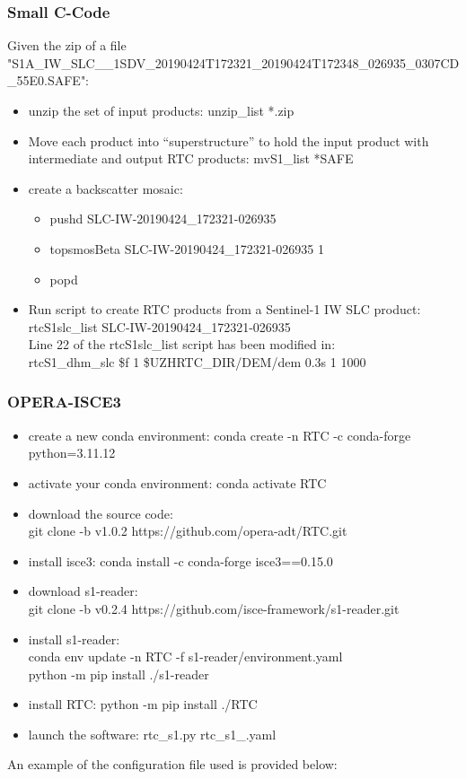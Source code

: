 \subsubsection{Small C-Code}
Given the zip of a file\\"S1A\_IW\_SLC\_\_1SDV\_20190424T172321\_20190424T172348\_026935\_0307CD\_55E0.SAFE":
\begin{itemize}
    \item unzip the set of input products:  unzip\_list *.zip 
    \item Move each product into “superstructure” to hold the input product with intermediate and output RTC products: mvS1\_list *SAFE
    \item create a backscatter mosaic:
    \begin{itemize}
        \item pushd SLC-IW-20190424\_172321-026935
        \item topsmosBeta SLC-IW-20190424\_172321-026935 1
        \item popd
    \end{itemize}
    \item Run script to create RTC products from a Sentinel-1 IW SLC product:\\ rtcS1slc\_list SLC-IW-20190424\_172321-026935\\
    Line 22 of the rtcS1slc\_list script has been modified in:\\ rtcS1\_dhm\_slc \$f 1 \$UZHRTC\_DIR/DEM/dem 0.3s 1 1000
\end{itemize}
\subsubsection{OPERA-ISCE3}
\begin{itemize}
    \item create a new conda environment: conda create -n RTC -c conda-forge python=3.11.12
    \item activate your conda environment: conda activate RTC
    \item download the source code:\\ git clone -b v1.0.2 https://github.com/opera-adt/RTC.git
    \item install isce3: conda install -c conda-forge isce3==0.15.0
    \item download s1-reader:\\
    git clone -b v0.2.4 https://github.com/isce-framework/s1-reader.git
    \item install s1-reader:\\conda env update -n RTC -f s1-reader/environment.yaml\\
    python -m pip install ./s1-reader
    \item install RTC:
    python -m pip install ./RTC
    \item launch the software: rtc\_s1.py rtc\_s1\_.yaml
\end{itemize}
An example of the configuration file used is provided below:
